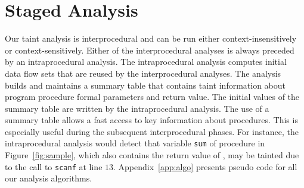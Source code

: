 \section{Staged Analysis}\label{stagedAnalysis}

\newcommand{\Aset}{\mathcal{A}}
\newcommand{\Pset}{\mathcal{P}}
\newcommand{\varset}{\mathit{Var}}
\newcommand{\instset}{\mathit{Inst}}
\newcommand{\procset}{\mathit{Proc}}
\newcommand{\formalsset}{\mathit{formals}}
\newcommand{\firstfunc}{\mathit{first}}
\newcommand{\toplevelfunc}{\mathit{toplevel}}
\newcommand{\pointsto}[2]{{pt}_{[#1]}(#2)}
\newcommand{\pointstobefore}[2]{{pt}_{[\overline{#1}]	}(#2)}
\newcommand{\pointstoafter}[2]{{pt}_{[\underline{#1}]}(#2)}

\newcommand{\myinflow}{\mathit{IN}}
\newcommand{\myoutflow}{\mathit{OUT}}
\newcommand{\ifff}{\mathit{iff}}
\newcommand{\aand}{\mathit{and}}
\newcommand{\mybigcup}[2]{\mathlarger{\bigcup_{#1}^{#2}}}

\newcommand{\copydef}{$\text{COPY}\ [p = q]$}
\newcommand{\loaddef}{$\text{LOAD}\ [p = *q]$}
\newcommand{\addrofdef}{$\text{ADDROF}\ [p = \&a]$}
\newcommand{\storedef}{$\text{STORE}\ [*p = q]$}
\newcommand{\sourcedef}{\text{SOURCE}\ [r = \text{call}\ \text{func}(a_0, a_1, ..., a_n)]}
\newcommand{\calldef}{\text{CALL} [r = \text{call}\ \text{func}(a_0, a_1, ..., a_n)]}
\newcommand{\callinsdef}{\text{CALL-INS} [r = \text{call}\ \text{func}(a_0, a_1, ..., a_n)]}
\newcommand{\sinkdef}{\text{SINK} [r = \text{call}\ \text{func}]}

Our taint analysis is interprocedural and can be run
either context-insensitively or context-sensitively.
Either of the interprocedural analyses is always preceded
by an intraprocedural analysis. The intraprocedural analysis
computes initial data flow sets that are reused by the
interprocedural analyses.
The analysis builds and maintains a summary table that contains
taint information about program procedure formal parameters
and return value.
The initial values of the summary table are written by
the intraprocedural analysis. The use of a summary table
allows a fast access to key information about procedures.
This is especially useful during the subsequent interprocedural
phases.
For instance, the intraprocedural analysis would
detect that variable \texttt{sum} of procedure \compute{} in
Figure~\ref{fig:sample}, which also contains the return
value of \compute{}, may be tainted due to the call
to \texttt{scanf} at line $13$.
Appendix~\ref{app:algo} presents pseudo code for all
our analysis algorithms.

